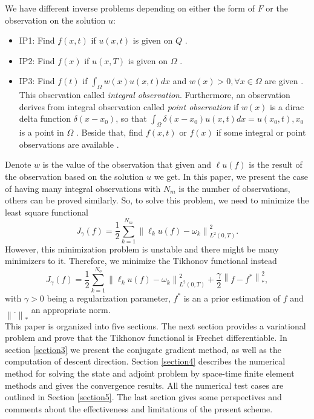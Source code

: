 \documentclass[]{article}
\begin{document}
We have different inverse problems depending on either the form of $F$ or the observation on the solution $u$: 
\begin{itemize}
	\item IP1: Find $f(x, t)$ if $u(x, t)$ is given on $Q$ \cite{a1, a2}.
	\item IP2: Find $f(x)$ if $u(x, T)$ is given on $\Omega$ \cite{a3, a4, a5, a6}.
	\item IP3: Find $f(t)$ if $\int_\Omega w(x)u(x, t)dx$ and $w(x)>0, \forall x\in \Omega$ are given \cite{a7, a8, a9}. This observation called \textit{integral observation}. Furthermore, an observation derives from integral observation called \textit{point observation} if $w(x)$ is a dirac delta function $\delta(x-x_0)$, so that $\int_\Omega\delta(x-x_0)u(x, t)dx=u(x_0, t), x_0$ is a point in $\Omega$ \cite{a10, a11, a12}. Beside that, find $f(x, t)$ or $f(x)$ if some integral or point observations are available \cite{a13}.
\end{itemize}
Denote $w$ is the value of the observation that given and $\ell u(f)$ is the result of the observation based on the solution $u$ we get. In this paper, we present  the case of having many integral observations with $N_m$ is the number of observations, others can be proved similarly. So, to solve this problem, we need to minimize the least square functional \cite{a14, a15}
$$J_{\gamma}(f)=\frac{1}{2}\sum_{k=1}^{N_{m}}\left\|\ell_k u(f)-\omega_k\right\|_{L^2(0, T)}^2.$$
However, this minimization problem is unstable and there might be many minimizers to it. Therefore, we minimize the Tikhonov functional instead
$$J_{\gamma}(f)=\frac{1}{2}\sum_{k=1}^{N_{o}}\left\|\ell_k u(f)-\omega_k\right\|_{L^2(0, T)}^2+\frac{\gamma}{2}\left\|f-f^*\right\|_{*}^2,$$
with $\gamma>0$ being a regularization parameter, $f^*$ is an a prior estimation of $f$ and $\left\|.\right\|_*$ an appropriate norm.
\\
This paper is organized into five sections. The next section provides a variational problem and prove that the Tikhonov functional is Frechet differentiable. In section \ref{section3} we present the conjugate gradient method, as well as the computation of descent direction. Section \ref{section4} describes the numerical method for solving the state and adjoint problem by space-time finite element methods and gives the convergence results. All the numerical test cases are outlined in Section \ref{section5}. The last section gives some perspectives and comments about the effectiveness and limitations of the present scheme.
\end{document}
